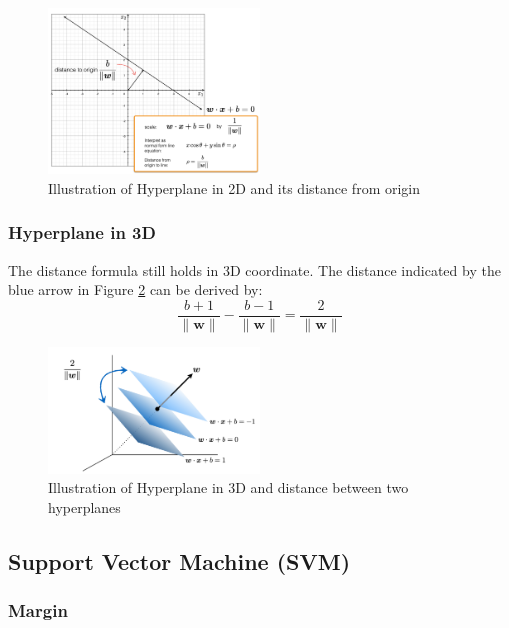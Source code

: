 \documentclass[11pt]{article}
\begin{document}
\begin{figure}[H]
\centering
\includegraphics[width=0.5\textwidth]{hyperplane.png}
\caption{Illustration of Hyperplane in 2D and its distance from origin}
\label{fig:hyperplane}
\end{figure}

\subsubsection{Hyperplane in 3D}
The distance formula still holds in 3D coordinate. The distance indicated by the blue arrow in Figure \ref{fig:3dhyper} can be derived by:
\begin{equation}
\frac{b+1}{\|\boldsymbol{w}\|}-\frac{b-1}{\|\boldsymbol{w}\|}=\frac{2}{\|\boldsymbol{w}\|}
\end{equation}

\begin{figure}[H]
\centering
\includegraphics[width=0.5\textwidth]{3d_hyperplane.png}
\caption{Illustration of Hyperplane in 3D and distance between two hyperplanes}
\label{fig:3dhyper}
\end{figure}


\subsection{Support Vector Machine (SVM)}

\subsubsection{Margin}
\label{sec:margin}
\end{document}
